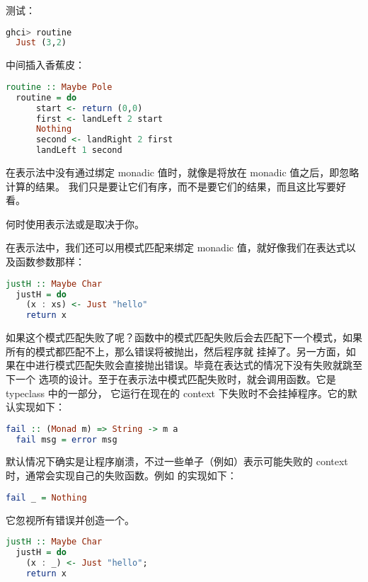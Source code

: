 \documentclass[./main.tex]{subfiles}
\begin{document}
测试：

\begin{lstlisting}[language=Haskell]
  ghci> routine
  Just (3,2)
\end{lstlisting}

中间插入香蕉皮：

\begin{lstlisting}[language=Haskell]
  routine :: Maybe Pole
  routine = do
      start <- return (0,0)
      first <- landLeft 2 start
      Nothing
      second <- landRight 2 first
      landLeft 1 second
\end{lstlisting}

在表示法中没有通过\acode{<-}绑定 monadic 值时，就像是将\acode{>>}放在 monadic 值之后，即忽略计算的结果。
我们只是要让它们有序，而不是要它们的结果，而且这比写要好看。

何时使用表示法或是\acode{>>=}取决于你。

在表示法中，我们还可以用模式匹配来绑定 monadic 值，就好像我们在表达式以及函数参数那样：

\begin{lstlisting}[language=Haskell]
  justH :: Maybe Char
  justH = do
    (x : xs) <- Just "hello"
    return x
\end{lstlisting}

如果这个模式匹配失败了呢？函数中的模式匹配失败后会去匹配下一个模式，如果所有的模式都匹配不上，那么错误将被抛出，然后程序就
挂掉了。另一方面，如果在中进行模式匹配失败会直接抛出错误。毕竟在表达式的情况下没有失败就跳至下一个
选项的设计。至于在表示法中模式匹配失败时，就会调用函数。它是 typeclass 中的一部分，
它运行在现在的 context 下失败时不会挂掉程序。它的默认实现如下：

\begin{lstlisting}[language=Haskell]
  fail :: (Monad m) => String -> m a
  fail msg = error msg
\end{lstlisting}

默认情况下确实是让程序崩溃，不过一些单子（例如）表示可能失败的 context 时，通常会实现自己的失败函数。例如
的实现如下：

\begin{lstlisting}[language=Haskell]
  fail _ = Nothing
\end{lstlisting}

它忽视所有错误并创造一个。

\begin{lstlisting}[language=Haskell]
  justH :: Maybe Char
  justH = do
    (x : _) <- Just "hello";
    return x
\end{lstlisting}
\end{document}
